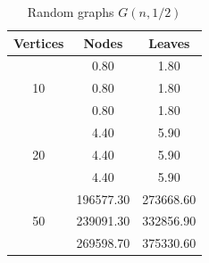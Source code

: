 \begin{table}[h]
    \centering
    \begin{tabular}{ccc}
    \toprule
    Vertices & Nodes & Leaves \\
    \midrule
    \multirow{3}{*}{10} & 0.80 & 1.80 \\
     & 0.80 & 1.80 \\
     & 0.80 & 1.80 \\
    \cmidrule(lr){1-3}
    \multirow{3}{*}{20} & 4.40 & 5.90 \\
     & 4.40 & 5.90 \\
     & 4.40 & 5.90 \\
    \cmidrule(lr){1-3}
    \multirow{3}{*}{50} & 196577.30 & 273668.60 \\
     & 239091.30 & 332856.90 \\
     & 269598.70 & 375330.60 \\
    \bottomrule
    \end{tabular}
    \caption{Random graphs $G(n, 1/2)$}
\end{table}
